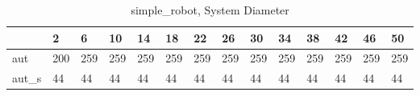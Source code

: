 \begin{table}
\caption{simple_robot, System Diameter}
\label{simple_robot_diam}
\begin{tabular}{llllllllllllll}
\toprule
 & 2 & 6 & 10 & 14 & 18 & 22 & 26 & 30 & 34 & 38 & 42 & 46 & 50 \\
\midrule
aut & 200 & 259 & 259 & 259 & 259 & 259 & 259 & 259 & 259 & 259 & 259 & 259 & 259 \\
aut_s & 44 & 44 & 44 & 44 & 44 & 44 & 44 & 44 & 44 & 44 & 44 & 44 & 44 \\
\bottomrule
\end{tabular}
\end{table}
